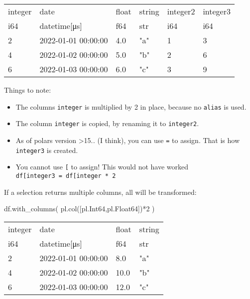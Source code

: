 \documentclass[
  letterpaper,
  DIV=11,
  numbers=noendperiod]{scrartcl}
\newenvironment{Shaded}{\begin{snugshade}}{\end{snugshade}}
\newcommand{\DecValTok}[1]{\textcolor[rgb]{0.68,0.00,0.00}{#1}}
\newcommand{\NormalTok}[1]{\textcolor[rgb]{0.00,0.23,0.31}{#1}}
\newcommand{\OperatorTok}[1]{\textcolor[rgb]{0.37,0.37,0.37}{#1}}
\providecommand{\tightlist}{%
  \setlength{\itemsep}{0pt}\setlength{\parskip}{0pt}}\usepackage{longtable,booktabs,array}
\begin{document}
\begin{longtable}[]{@{}llllll@{}}
\toprule()
integer & date & float & string & integer2 & integer3 \\
i64 & datetime{[}μs{]} & f64 & str & i64 & i64 \\
\midrule()
\endhead
2 & 2022-01-01 00:00:00 & 4.0 & "a" & 1 & 3 \\
4 & 2022-01-02 00:00:00 & 5.0 & "b" & 2 & 6 \\
6 & 2022-01-03 00:00:00 & 6.0 & "c" & 3 & 9 \\
\bottomrule()
\end{longtable}

Things to note:

\begin{itemize}
\tightlist
\item
  The columns \texttt{integer} is multiplied by 2 in place, because no
  \texttt{alias} is used.
\item
  The column \texttt{integer} is copied, by renaming it to
  \texttt{integer2}.
\item
  As of polars version \textgreater15.\emph{.} (I think), you can use
  \texttt{=} to assign. That is how \texttt{integer3} is created.
\item
  You cannot use \texttt{{[}} to assign! This would not have worked
  \texttt{df{[}\textquotesingle{}integer3\textquotesingle{}{]}\ =\ df{[}\textquotesingle{}integer\textquotesingle{}{]}\ *\ 2}
\end{itemize}

If a selection returns multiple columns, all will be transformed:

\begin{Shaded}
\begin{Highlighting}[]
\NormalTok{df.with\_columns(}
\NormalTok{    pl.col([pl.Int64,pl.Float64])}\OperatorTok{*}\DecValTok{2}
\NormalTok{)}
\end{Highlighting}
\end{Shaded}

\begin{longtable}[]{@{}llll@{}}
\toprule()
integer & date & float & string \\
i64 & datetime{[}μs{]} & f64 & str \\
\midrule()
\endhead
2 & 2022-01-01 00:00:00 & 8.0 & "a" \\
4 & 2022-01-02 00:00:00 & 10.0 & "b" \\
6 & 2022-01-03 00:00:00 & 12.0 & "c" \\
\bottomrule()
\end{longtable}
\end{document}
